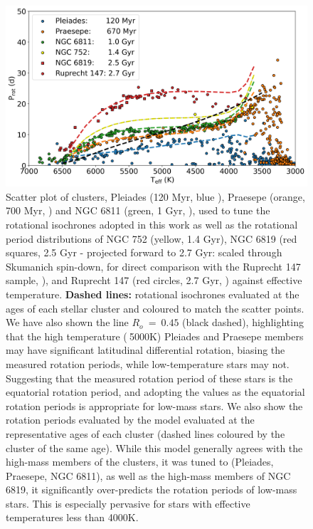 \begin{figure}
\centering
 \includegraphics[width=\textwidth]{Figures/rot_gap_figures/com_gap_clus.png}
 \caption[Cluster rotation periods distributions against effective temperature.]{Scatter plot of clusters, Pleiades (120 Myr, blue \citep{rebull_rotation_2016}), Praesepe (orange, 700 Myr, \citep{douglas_poking_2017, douglas_k2_2019}) and NGC 6811 (green, 1 Gyr, \citep{curtis_temporary_2019}), used to tune the rotational isochrones adopted in this work \citep{spada_competing_2020} as well as the rotational period distributions of NGC 752 (yellow, 1.4 Gyr), NGC 6819 (red squares, 2.5 Gyr - projected forward to 2.7 Gyr: scaled through Skumanich spin-down, for direct comparison with the Ruprecht 147 sample, \citep{meibom_kepler_2011}), and Ruprecht 147 (red circles, 2.7 Gyr, \citep{curtis_when_2020}) against effective temperature. \textbf{Dashed lines:} \citep{spada_competing_2020} rotational isochrones evaluated at the ages of each stellar cluster and coloured to match the scatter points. We have also shown the line $R_o \ = \ 0.45$ (black dashed), highlighting that the high temperature ($\>$5000K) Pleiades and Praesepe members may have significant latitudinal differential rotation, biasing the measured rotation periods, while low-temperature stars may not. Suggesting that the measured rotation period of these stars is the equatorial rotation period, and adopting the \citet{spada_competing_2020} values as the equatorial rotation periods is appropriate for low-mass stars. We also show the rotation periods evaluated by the \citet{spada_competing_2020} model evaluated at the representative ages of each cluster (dashed lines coloured by the cluster of the same age).
While this model generally agrees with the high-mass members of the clusters, it was tuned to (Pleiades, Praesepe, NGC 6811), as well as the high-mass members of NGC 6819, it significantly over-predicts the rotation periods of low-mass stars.
This is especially pervasive for stars with effective temperatures less than 4000K.}
 \label{fig:com_gap_clus}
\end{figure}

